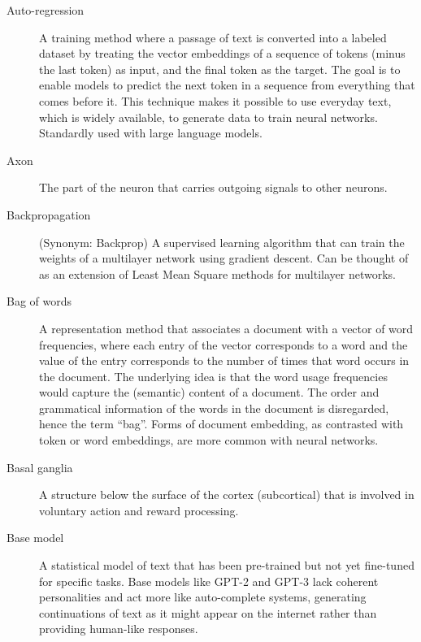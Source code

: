\begin{description}

\item[Auto-regression] A training method where a passage of text is converted into a labeled dataset by treating the vector embeddings of a sequence of tokens (minus the last token) as input, and the final token as the target. The goal is to enable models to predict the next token in a sequence from everything that comes before it. This technique makes it possible to use everyday text, which is widely available, to generate data to train neural networks. Standardly used with large language models.

\item[Axon] The part of the neuron that carries outgoing signals to other neurons.

\item[Backpropagation] (Synonym: Backprop) A supervised learning algorithm that can train the weights of a multilayer network using gradient descent. Can be thought of as an extension of Least Mean Square methods for multilayer networks.

\item[Bag of words] A representation method that associates a document with a vector of word frequencies, where each entry of the vector corresponds to a word and the value of the entry corresponds to the number of times that word occurs in the document. The underlying idea is that the word usage frequencies would capture the (semantic) content of a document. The order and grammatical information of the words in the document is disregarded, hence the term ``bag''.  Forms of document embedding, as contrasted with token or word embeddings, are more common with neural networks.

\item[Basal ganglia] A structure below the surface of the cortex (subcortical) that is involved in voluntary action and reward processing.

\item[Base model] A statistical model of text that has been pre-trained but not yet fine-tuned for specific tasks. Base models like GPT-2 and GPT-3 lack coherent personalities and act more like auto-complete systems, generating continuations of text as it might appear on the internet rather than providing human-like responses.


\end{description}
